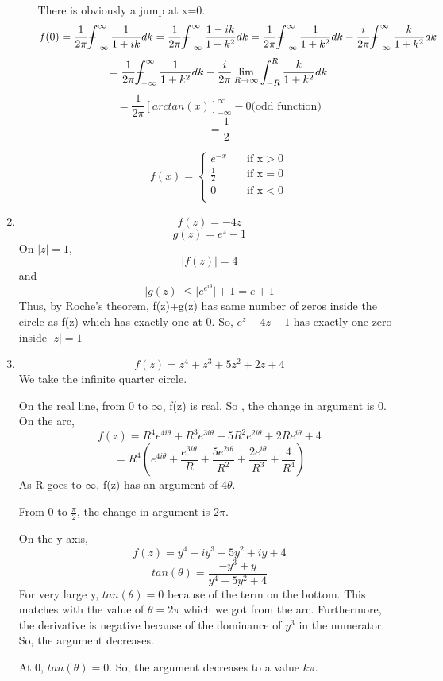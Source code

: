 \documentclass[a4paper]{article}
\def\Xint#1{\mathchoice
	{\XXint\displaystyle\textstyle{#1}}%
	{\XXint\textstyle\scriptstyle{#1}}%
	{\XXint\scriptstyle\scriptscriptstyle{#1}}%
	{\XXint\scriptscriptstyle\scriptscriptstyle{#1}}%
	\!\int}
\def\XXint#1#2#3{{\setbox0=\hbox{$#1{#2#3}{\int}$}
		\vcenter{\hbox{$#2#3$}}\kern-.5\wd0}}
\def\dashint{\Xint-}
\begin{document}
\begin{enumerate}
\begin{enumerate}
There is obviously a jump at x=0.
\[	f(0) = \frac{1}{2\pi} \dashint_{-\infty}^\infty\frac{1}{1+ik}dk =\frac{1}{2\pi} \dashint_{-\infty}^\infty\frac{1-ik}{1+k^2}dk =\frac{1}{2\pi} \dashint_{-\infty}^\infty\frac{1}{1+k^2}dk  -\frac{i}{2\pi} \dashint_{-\infty}^\infty\frac{k}{1+k^2}dk \]
\[=\frac{1}{2\pi} \dashint_{-\infty}^\infty\frac{1}{1+k^2}dk  -\frac{i}{2\pi} \lim_ {R \to \infty}\int_{-R}^R\frac{k}{1+k^2}dk \]
\[=\frac{1}{2\pi} \left[arctan(x)\right]_{-\infty}^{\infty}  -0 \text{(odd function)} \]
\[= \frac{1}{2}\]


\[   
f(x) = 
\begin{cases}
e^{-x} &\quad\text{if x} >0 \\
\frac{1}{2} &\quad\text{if x} =0 \\
0 &\quad\text{if x} <0\\
\end{cases}
\]




\end{enumerate}

\item 
\[f(z)= -4z\]
\[g(z) = e^z-1\] 
On $|z|=1$, \[ \lvert f(z)\rvert =4 \] and \[ \lvert g(z) \rvert \leq \lvert e^{e^{i\theta}}\rvert +1 =e+1 \]
Thus, by Roche's theorem, f(z)+g(z) has same number of zeros inside the circle as f(z) which has exactly one at 0.
 So, $e^z-4z-1$ has exactly one zero inside $|z|=1$
\item \[f(z)= z^4 +z^3 +5z^2+ 2z+4\]
We take the infinite quarter circle.
\vspace{50mm}

On the real line, from 0 to $\infty$, f(z) is real. So , the change in argument is 0.
On the arc, 
\[f(z) = R^4 e^{4i\theta}+R^3 e^{3i\theta}+5R^2 e^{2i\theta}+2R e^{i\theta}+4\] 
\[ = R^4 (e^{4i\theta}+\frac {e^{3i\theta}}{R}+\frac{5e^{2i\theta}}{R^2}+\frac{2 e^{i\theta}}{R^3}+\frac{4}{R^4})\]
As R goes to $\infty$, f(z) has an argument of 4$\theta$.

From 0 to $\frac{\pi}{2}$, the change in argument is $2\pi$.

On the y axis, \[f(z)  = y^4 -iy^3-5y^2+iy+4\]
\[tan(\theta) = \frac{-y^3+y}{y^4-5y^2+4}\]
For very large y, $tan(\theta) =0 $ because of the term on the bottom. This matches with the value of $\theta = 2\pi $ which we got from the arc. Furthermore, the derivative is negative because of the dominance of $y^3$ in the numerator. So, the argument decreases.

At 0, $tan(\theta) =0 $. So, the argument decreases to a value $k\pi$. 


\end{enumerate}
\end{document}
